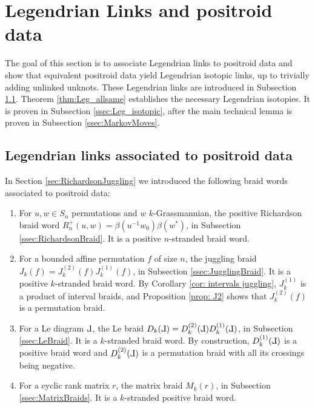 \documentclass[10pt]{amsart}
\theoremstyle{plain}
\theoremstyle{definition}
\theoremstyle{remark}
\numberwithin{equation}{section}
\def\Le{\reflectbox{$\mathrm{L}$}}
\begin{document}
\section{Legendrian Links and positroid data}\label{sec:Legendrian}


The goal of this section is to associate Legendrian links to positroid data and show that equivalent positroid data yield Legendrian isotopic links, up to trivially adding unlinked unknots. These Legendrian links are introduced in Subsection \ref{ssec:Leglinks}. Theorem \ref{thm:Leg_allsame} establishes the necessary Legendrian isotopies. It is proven in Subsection \ref{ssec:Leg_isotopic}, after the main technical lemma is proven in Subsection \ref{ssec:MarkovMoves}.

\subsection{Legendrian links associated to positroid data}\label{ssec:Leglinks} In Section \ref{sec:RichardsonJuggling}  we introduced the following braid words associated to positroid data:

\begin{enumerate}
    \item For $u,w\in S_n$ permutations and $w$ $k$-Grassmannian, the positive Richardson braid word %
    $R^{+}_{n}(u, w)=\beta(u^{-1}w_0)\beta(w^*)$,
    in Subsection \ref{ssec:RichardsonBraid}. It is a positive $n$-stranded braid word.\\

    \item For a bounded affine permutation $f$ of size $n$, the juggling braid $J_k(f)=J_k^{(2)}(f)J^{(1)}_k(f)$, in Subsection \ref{ssec:JugglingBraid}. It is a positive $k$-stranded braid word. By Corollary \ref{cor: intervals juggling}, $J_k^{(1)}$ is a product of interval braids, and Proposition \ref{prop: J2}  shows that $J^{(2)}_k(f)$ is a permutation braid.\\

    \item For a Le diagram $\Le$, the Le braid $D_k(\Le)=D_k^{(2)}(\Le)D_k^{(1)}(\Le)$, in Subsection \ref{ssec:LeBraid}. It is a $k$-stranded braid word. By construction, $D_k^{(1)}(\Le)$ is a positive braid word and $D_k^{(2)}(\Le)$ is a permutation braid with all its crossings being negative.\\

    \item For a  cyclic rank matrix $r$, the  matrix braid $M_k(r)$, in Subsection \ref{ssec:MatrixBraids}. It is a $k$-stranded positive braid word.
\end{enumerate}
\end{document}
